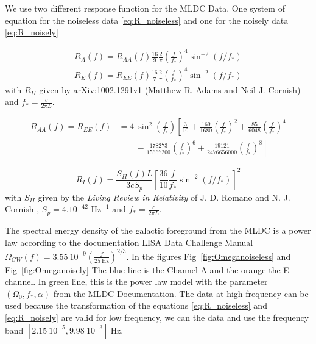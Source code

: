 \documentclass[a4paper,12pt]{article}
\begin{document}
We use two different response function for the MLDC Data. One system of equation for the noiseless data \ref{eq:R_noiseless} and one for the noisely data \ref{eq:R_noisely} 

\begin{subequations}
\begin{align}
R_A(f) = R_{AA}(f)\frac{16}{9}\frac{2}{\pi}\left(\frac{f}{f_*}\right)^4 \sin^{-2}(f/f_*) \\
 R_E(f) = R_{EE}(f)\frac{16}{7}\frac{2}{\pi}\left(\frac{f}{f_*}\right)^4 \sin^{-2}(f/f_*)
\end{align}\label{eq:R_noiseless}
\end{subequations}
with $R_{II}$ given by arXiv:1002.1291v1 (Matthew R. Adams and Neil J. Cornish) \cite{Adams:2010vc}
and $f_* = \frac{c}{2 \pi L}$.


\begin{align}
R_{AA}(f) = R_{EE}(f) &=  4 \ {\sin}^2\left(\frac{f}{f_*}\right)\left[ \frac{3}{10} + \frac{169}{1680} \left(\frac{f}{f_*}\right)^2 +\frac{85}{6048} \left(\frac{f}{f_*}\right)^4 \right. \nonumber\\
 &\qquad \left. {}   - \frac{178273}{15667200} \left(\frac{f}{f_*}\right)^6 + \frac{19121}{2476656000} \left(\frac{f}{f_*}\right)^8 \right]
\end{align}


\begin{equation}
    R_I(f) = \frac{S_{II}(f)L}{3 c S_p} \left [\frac{36}{10}\frac{f}{f_*} \sin^{-2}(f/f_*) \right ]^2
\label{eq:R_noisely}
\end{equation}
with $S_{II}$ given by the \textit{Living Review in Relativity} of J.  D.  Romano  and  N.  J.  Cornish \cite{Romano2017}, $S_p = 4 . 10^{-42} \text{ Hz}^{-1}$ and $f_* = \frac{c}{2 \pi L}$. 

The spectral energy density of the galactic foreground from the MLDC is a power law according to the documentation LISA Data Challenge Manual \cite{LDCM} $\Omega_{GW}(f) = 3.55 \ 10^{-9}\left(\frac{f}{25 \ \text{Hz}}\right)^{2/3}$.  In the figures Fig~\ref{fig:Omeganoiseless} and Fig~\ref{fig:Omeganoisely} The blue line is the Channel A and the orange the E channel. In green line, this is the power law model with the parameter $(\Omega_0, f_*, \alpha)$ from the MLDC Documentation. The data at high frequency can be used because the transformation of the equations \ref{eq:R_noiseless} and \ref{eq:R_noisely} are valid for low frequency, we can the data and use the frequency band  $[2.15 \ 10^{-5},  9.98 \ 10^{-3}] \ \text{Hz}$.
\end{document}
